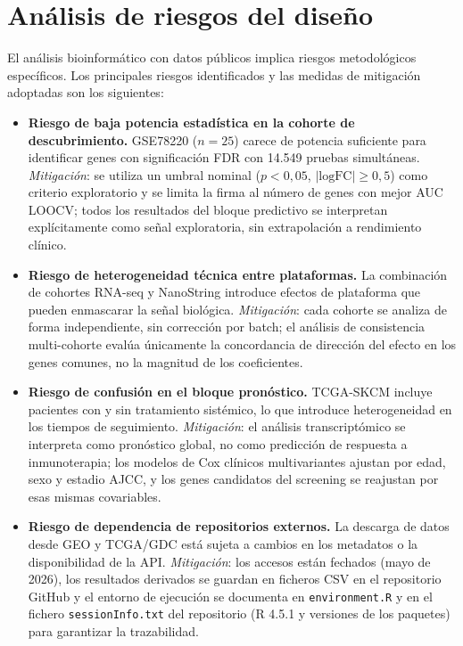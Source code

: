 \section{Análisis de riesgos del diseño}

El análisis bioinformático con datos públicos implica riesgos metodológicos específicos. Los principales riesgos identificados y las medidas de mitigación adoptadas son los siguientes:

\begin{itemize}
  \item \textbf{Riesgo de baja potencia estadística en la cohorte de descubrimiento.} GSE78220 ($n = 25$) carece de potencia suficiente para identificar genes con significación FDR con 14.549 pruebas simultáneas. \textit{Mitigación}: se utiliza un umbral nominal ($p < 0{,}05$, $|\text{logFC}| \geq 0{,}5$) como criterio exploratorio y se limita la firma al número de genes con mejor AUC LOOCV; todos los resultados del bloque predictivo se interpretan explícitamente como señal exploratoria, sin extrapolación a rendimiento clínico.

  \item \textbf{Riesgo de heterogeneidad técnica entre plataformas.} La combinación de cohortes RNA-seq y NanoString introduce efectos de plataforma que pueden enmascarar la señal biológica. \textit{Mitigación}: cada cohorte se analiza de forma independiente, sin corrección por batch; el análisis de consistencia multi-cohorte evalúa únicamente la concordancia de dirección del efecto en los genes comunes, no la magnitud de los coeficientes.

  \item \textbf{Riesgo de confusión en el bloque pronóstico.} TCGA-SKCM incluye pacientes con y sin tratamiento sistémico, lo que introduce heterogeneidad en los tiempos de seguimiento. \textit{Mitigación}: el análisis transcriptómico se interpreta como pronóstico global, no como predicción de respuesta a inmunoterapia; los modelos de Cox clínicos multivariantes ajustan por edad, sexo y estadio AJCC, y los genes candidatos del screening se reajustan por esas mismas covariables.

  \item \textbf{Riesgo de dependencia de repositorios externos.} La descarga de datos desde GEO y TCGA/GDC está sujeta a cambios en los metadatos o la disponibilidad de la API. \textit{Mitigación}: los accesos están fechados (mayo de 2026), los resultados derivados se guardan en ficheros CSV en el repositorio GitHub y el entorno de ejecución se documenta en \texttt{environment.R} y en el fichero \texttt{sessionInfo.txt} del repositorio (R 4.5.1 y versiones de los paquetes) para garantizar la trazabilidad.
\end{itemize}


